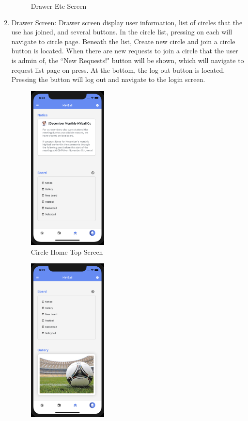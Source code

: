 \documentclass[conference]{IEEEtran}
\begin{document}
\begin{enumerate}
\begin{figure}[h]
        \caption{Drawer Etc Screen}
        \label{fig:my_label}
    \end{figure}
    \item Drawer Screen: Drawer screen display user information, list of circles that the use has joined, and several buttons. In the circle list, pressing on each will navigate to circle page. Beneath the list, Create new circle and join a circle button is located. When there are new requests to join a circle that the user is admin of, the ``New Requests!" button will be shown, which will navigate to request list page on press. At the bottom, the log out button is located. Pressing the button will log out and navigate to the login screen.
    \begin{figure}[h]
        \centering
        \includegraphics[width=4cm]{images/circlehome.png}
        \caption{Circle Home Top Screen}
        \label{fig:my_label}
    \end{figure}
    \begin{figure}[h]
        \centering
        \includegraphics[width=4cm]{images/circlehome2.png}

\end{figure}
\end{enumerate}
\end{document}
